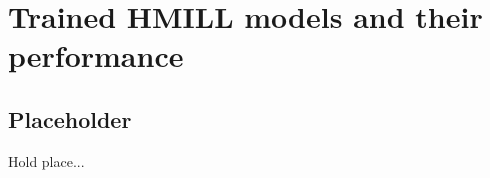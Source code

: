\chapter{Trained HMILL models and their performance} \label{app:models}
\section{Placeholder}
Hold place...

